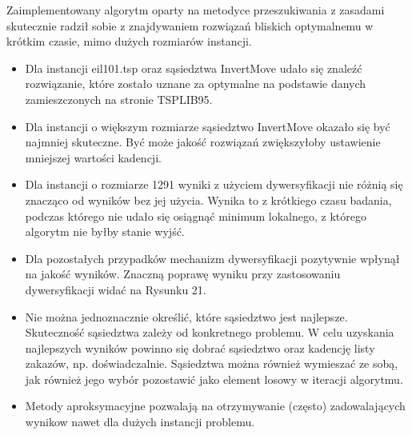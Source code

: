 \documentclass[a4paper,11pt]{article}
\begin{document}
Zaimplementowany algorytm oparty na metodyce przeszukiwania z zasadami skutecznie radził sobie z znajdywaniem rozwiązań bliskich optymalnemu w krótkim czasie, mimo dużych rozmiarów instancji. 
\begin{itemize}
\item Dla instancji eil101.tsp oraz sąsiedztwa InvertMove udało się znaleźć rozwiązanie, które zostało uznane za optymalne na podstawie danych zamieszczonych na stronie TSPLIB95.
\item Dla instancji o większym rozmiarze sąsiedztwo InvertMove okazało się być najmniej skuteczne. Być może jakość rozwiązań zwiększyłoby ustawienie mniejszej wartości kadencji.
\item Dla instancji o rozmiarze 1291 wyniki z użyciem dywersyfikacji nie różnią się znacząco od wyników bez jej użycia. Wynika to z krótkiego czasu badania, podczas którego nie udało się osiągnąć minimum lokalnego, z którego algorytm nie byłby stanie wyjść.
\item Dla pozostałych przypadków mechanizm dywersyfikacji pozytywnie wpłynął na jakość wyników. Znaczną poprawę wyniku przy zastosowaniu dywersyfikacji widać na Rysunku 21.
\item Nie można jednoznacznie określić, które sąsiedztwo jest najlepsze. Skuteczność sąsiedztwa zależy od konkretnego problemu. W celu uzyskania najlepszych wyników powinno się dobrać sąsiedztwo oraz kadencję listy zakazów, np. doświadczalnie. Sąsiedztwa można również wymieszać ze sobą, jak również jego wybór pozostawić jako element losowy w iteracji algorytmu.
\item Metody aproksymacyjne pozwalają na otrzymywanie (często) zadowalających wynikow nawet dla dużych instancji problemu.
\end{itemize}
\end{document}

